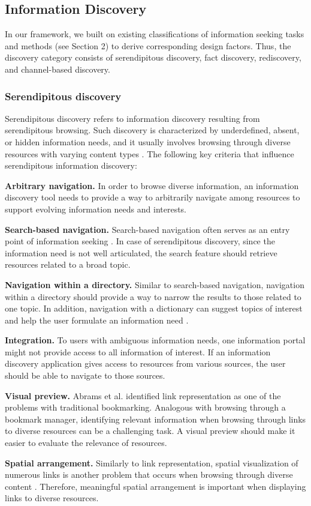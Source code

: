 \documentclass{casconpaper}
\begin{document}
{\subsection{Information Discovery}
In our framework, we built on existing classifications of information seeking tasks and methods (see Section 2) to derive corresponding design factors. Thus, the discovery category consists of serendipitous discovery, fact discovery, rediscovery, and channel-based discovery. 
} %

{\subsubsection{Serendipitous discovery}
Serendipitous discovery refers to information discovery resulting from serendipitous  browsing. Such discovery is characterized by underdefined, absent, or hidden information needs, and it usually involves browsing through diverse resources with varying content types \cite{kellar2006}. The following key criteria that influence serendipitous information discovery:

\textbf{Arbitrary navigation.} In order to browse diverse information, an information discovery tool needs to provide a way to arbitrarily navigate among resources to support evolving information needs and interests.

\textbf{Search-based navigation.} Search-based navigation often serves as an entry point of information seeking \cite{levene}. In case of serendipitous discovery, since the information need is not well articulated, the search feature should retrieve resources related to a broad topic.

\textbf{Navigation within a directory.} Similar to search-based navigation, navigation within a directory should provide a way to narrow the results to those related to one topic. In addition, navigation with a dictionary can suggest topics of interest and help the user formulate an information need \cite{levene}.

\textbf{Integration.} To users with ambiguous information needs, one information portal might not provide access to all information of interest. If an information discovery application gives access to resources from various sources, the user should be able to navigate to those sources.

\textbf{Visual preview.} Abrams et al. \cite{abrams} identified link representation as one of the problems with traditional bookmarking. Analogous with browsing through a bookmark manager, identifying relevant information when browsing through links to diverse resources can be a challenging task. A visual preview should make it easier to evaluate the relevance of resources.

\textbf{Spatial arrangement.} Similarly to link representation, spatial visualization of numerous links is another problem that occurs when browsing through diverse content \cite{abrams}. Therefore, meaningful spatial arrangement is important when displaying links to diverse resources.



} %
\end{document}
